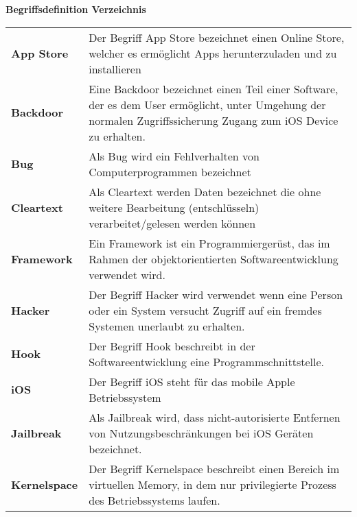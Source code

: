 %
%
% 
% 
% 

\begin{center}
{\Large\bfseries Begriffsdefinition Verzeichnis}
\end{center}

\begin{table*}[htbp]
    \begin{center}
      \begin{tabular}{p{3cm}p{12cm}} 
        
        \textbf{App Store} &  Der Begriff App Store bezeichnet einen Online Store, welcher es ermöglicht Apps herunterzuladen und zu installieren\\ 
        
        \textbf{Backdoor} &  Eine Backdoor bezeichnet einen Teil einer Software, der es dem User ermöglicht, unter Umgehung der normalen Zugriffssicherung Zugang zum iOS Device zu erhalten.\\
        \textbf{Bug} &  Als Bug wird ein Fehlverhalten von Computerprogrammen bezeichnet\\ 
		
		\textbf{Cleartext} &  Als Cleartext werden Daten bezeichnet die ohne weitere Bearbeitung (entschlüsseln) verarbeitet/gelesen werden können\\     
		
		\textbf{Framework} & Ein Framework ist ein Programmiergerüst, das im Rahmen der objektorientierten Softwareentwicklung verwendet wird. \\
		
		\textbf{Hacker} &  Der Begriff Hacker wird verwendet wenn eine Person oder ein System versucht Zugriff auf ein fremdes Systemen unerlaubt zu erhalten.\\
		\textbf{Hook} & Der Begriff Hook beschreibt in der Softwareentwicklung eine Programmschnittstelle.\\
		  
		\textbf{iOS} &  Der Begriff iOS steht für das mobile Apple Betriebssystem\\
		  
		 \textbf{Jailbreak} &  Als Jailbreak wird, dass nicht-autorisierte Entfernen von Nutzungsbeschränkungen bei iOS Geräten bezeichnet.\\  
		 \textbf{Kernelspace} & Der Begriff Kernelspace beschreibt einen Bereich im virtuellen Memory, in dem nur privilegierte Prozess des Betriebssystems laufen.\\ 
		      

\end{tabular}
\end{center}
\end{table*}
